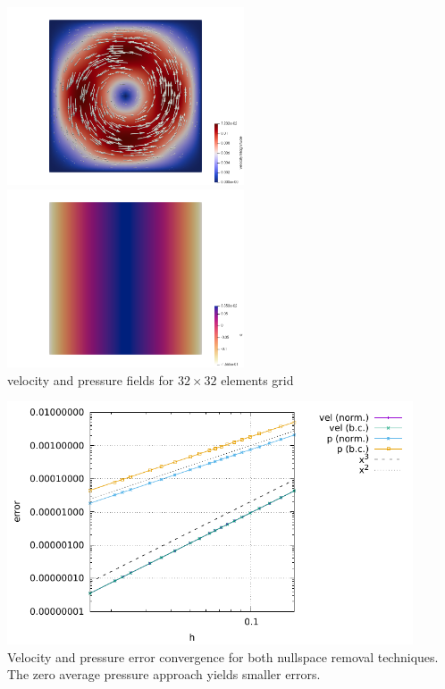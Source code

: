 \begin{center}
\includegraphics[width=7cm]{python_codes/fieldstone_18/results/vel}
\includegraphics[width=7cm]{python_codes/fieldstone_18/results/pressure}\\
{\captionfont velocity and pressure fields for $32\times 32$ elements grid}
\end{center}

\begin{center}
\includegraphics[width=12cm]{python_codes/fieldstone_18/results/errors}\\
{\captionfont Velocity and pressure error convergence for both nullspace removal 
techniques. The zero average pressure approach yields smaller errors.}
\end{center}

